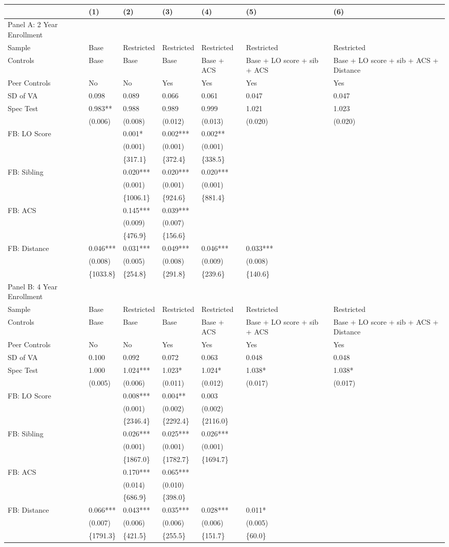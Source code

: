 \documentclass{article}
\begin{document}
\begin{table}[tbp] \centering
{}

{\footnotesize
\begin{tabularx}{\linewidth}{lCCCCCC}

\toprule
&{(1)}&{(2)}&{(3)}&{(4)}&{(5)}&{(6)} \tabularnewline
\midrule \addlinespace[\belowrulesep]
Panel A: 2 Year Enrollment&&&&&& \tabularnewline
\midrule Sample&Base&Restricted&Restricted&Restricted&Restricted&Restricted \tabularnewline
Controls&Base&Base&Base&Base + ACS&Base + LO score + sib + ACS&Base + LO score + sib + ACS + Distance \tabularnewline
Peer Controls&No&No&Yes&Yes&Yes&Yes \tabularnewline
\midrule SD of VA&0.098&0.089&0.066&0.061&0.047&0.047 \tabularnewline
Spec Test&0.983**&0.988&0.989&0.999&1.021&1.023 \tabularnewline
&(0.006)&(0.008)&(0.012)&(0.013)&(0.020)&(0.020) \tabularnewline
FB: LO Score&&0.001*&0.002***&0.002**&& \tabularnewline
&&(0.001)&(0.001)&(0.001)&& \tabularnewline
&&\{317.1\}&\{372.4\}&\{338.5\}&& \tabularnewline
FB: Sibling&&0.020***&0.020***&0.020***&& \tabularnewline
&&(0.001)&(0.001)&(0.001)&& \tabularnewline
&&\{1006.1\}&\{924.6\}&\{881.4\}&& \tabularnewline
FB: ACS&&0.145***&0.039***&&& \tabularnewline
&&(0.009)&(0.007)&&& \tabularnewline
&&\{476.9\}&\{156.6\}&&& \tabularnewline
FB: Distance&0.046***&0.031***&0.049***&0.046***&0.033***& \tabularnewline
&(0.008)&(0.005)&(0.008)&(0.009)&(0.008)& \tabularnewline
&\{1033.8\}&\{254.8\}&\{291.8\}&\{239.6\}&\{140.6\}& \tabularnewline
\midrule \midrule Panel B: 4 Year Enrollment&&&&&& \tabularnewline
\midrule Sample&Base&Restricted&Restricted&Restricted&Restricted&Restricted \tabularnewline
Controls&Base&Base&Base&Base + ACS&Base + LO score + sib + ACS&Base + LO score + sib + ACS + Distance \tabularnewline
Peer Controls&No&No&Yes&Yes&Yes&Yes \tabularnewline
\midrule SD of VA&0.100&0.092&0.072&0.063&0.048&0.048 \tabularnewline
Spec Test&1.000&1.024***&1.023*&1.024*&1.038*&1.038* \tabularnewline
&(0.005)&(0.006)&(0.011)&(0.012)&(0.017)&(0.017) \tabularnewline
FB: LO Score&&0.008***&0.004**&0.003&& \tabularnewline
&&(0.001)&(0.002)&(0.002)&& \tabularnewline
&&\{2346.4\}&\{2292.4\}&\{2116.0\}&& \tabularnewline
FB: Sibling&&0.026***&0.025***&0.026***&& \tabularnewline
&&(0.001)&(0.001)&(0.001)&& \tabularnewline
&&\{1867.0\}&\{1782.7\}&\{1694.7\}&& \tabularnewline
FB: ACS&&0.170***&0.065***&&& \tabularnewline
&&(0.014)&(0.010)&&& \tabularnewline
&&\{686.9\}&\{398.0\}&&& \tabularnewline
FB: Distance&0.066***&0.043***&0.035***&0.028***&0.011*& \tabularnewline
&(0.007)&(0.006)&(0.006)&(0.006)&(0.005)& \tabularnewline
&\{1791.3\}&\{421.5\}&\{255.5\}&\{151.7\}&\{60.0\}& \tabularnewline
\bottomrule 

\end{tabularx}
}
\end{table}
\end{document}
